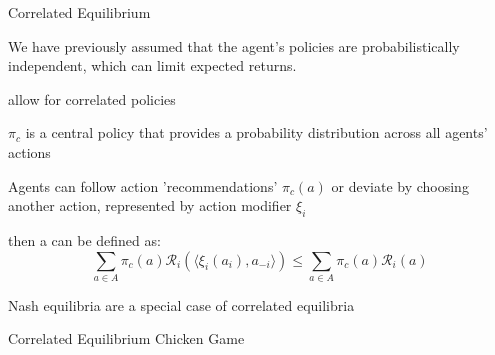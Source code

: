 \begin{frame}{Correlated Equilibrium}

    We have previously assumed that the agent's policies are probabilistically independent, which can limit expected returns.

    \blist
        \item {} allow for correlated policies
        \item \(\pi_c\) is a central policy that provides a probability distribution across all agents' actions
        \item Agents can follow action 'recommendations' $\pi_c(a)$ or deviate by choosing another action, represented by action modifier $\xi_i$
        \item then a  can be defined as:
    \elist
    \vspace{0pt}
    \begin{equation*}
        \sum_{a \in A}\pi_c(a)\mathcal{R}_i(\langle\xi_i(a_i), a_{-i}\rangle) \le \sum_{a \in A}\pi_c(a)\mathcal{R}_i(a)
    \end{equation*}

    \blist
     \item Nash equilibria are a special case of correlated equilibria 
    \elist
    
\end{frame}

\begin{frame}[t]{Correlated Equilibrium Chicken Game}

\vspace{10pt}

\centering
\gamechicken 

\begin{flushleft}

    
\end{flushleft}

\end{frame}

